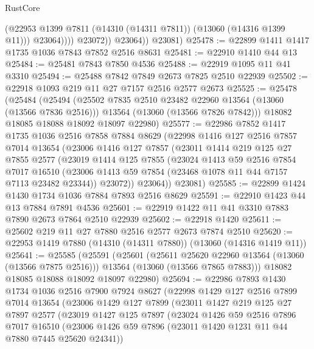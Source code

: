 \begin{lexlean}{RustCore}
\begin{coremodule}
                      (@22953 @1399 @7811 (@14310 (@14311 @7811)) (@13060 (@14316 @1399 @11)))
                      @23064))))
              @23072))
          @23064))
      @23081)
@25478 := @22899 @1411 @1417 @1735 @1036 @7843 @7852 @2516 @8631
@25481 := @22910 @1410 @44 @13
@25484 := @25481 @7843 @7850 @4536
@25488 := @22919 @1095 @11 @41 @3310
@25494 := @25488 @7842 @7849 @2673 @7825 @2510 @22939
@25502 := @22918 @1093 @219 @11 @27 @7157 @2516 @2577 @2673
@25525 := @25478
    (@25484
      (@25494
        (@25502 @7835 @2510 @23482 @22960 @13564 (@13060 (@13566 @7836 @2516)))
        @13564
        (@13060 (@13566 @7826 @7842)))
      @18082
      @18085
      @18088
      @18092
      @18097
      @22980)
@25577 := @22986
    @7852
    @1417
    @1735
    @1036
    @2516
    @7858
    @7884
    @8629
    (@22998
      @1416
      @127
      @2516
      @7857
      @7014
      @13654
      (@23006
        @1416
        @127
        @7857
        (@23011
          @1414
          @219
          @125
          @27
          @7855
          @2577
          (@23019
            @1414
            @125
            @7855
            (@23024
              @1413
              @59
              @2516
              @7854
              @7017
              @16510
              (@23006 @1413 @59 @7854 (@23468 @1078 @11 @44 @7157 @7113 @23482 @23344))
              @23072))
          @23064))
      @23081)
@25585 := @22899 @1424 @1430 @1734 @1036 @7884 @7893 @2516 @8629
@25591 := @22910 @1423 @44 @13 @7884 @7891 @4536
@25601 := @22919 @1422 @11 @41 @3310 @7883 @7890 @2673 @7864 @2510 @22939
@25602 := @22918 @1420
@25611 := @25602 @219 @11 @27 @7880 @2516 @2577 @2673 @7874 @2510
@25620 := @22953 @1419 @7880 (@14310 (@14311 @7880)) (@13060 (@14316 @1419 @11))
@25641 := @25585
    (@25591
      (@25601
        (@25611 @25620 @22960 @13564 (@13060 (@13566 @7875 @2516)))
        @13564
        (@13060 (@13566 @7865 @7883)))
      @18082
      @18085
      @18088
      @18092
      @18097
      @22980)
@25694 := @22986
    @7893
    @1430
    @1734
    @1036
    @2516
    @7900
    @7924
    @8627
    (@22998
      @1429
      @127
      @2516
      @7899
      @7014
      @13654
      (@23006
        @1429
        @127
        @7899
        (@23011
          @1427
          @219
          @125
          @27
          @7897
          @2577
          (@23019
            @1427
            @125
            @7897
            (@23024
              @1426
              @59
              @2516
              @7896
              @7017
              @16510
              (@23006 @1426 @59 @7896 (@23011 @1420 @1231 @11 @44 @7880 @7445 @25620 @24341))

\end{coremodule}
\end{lexlean}
